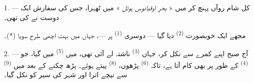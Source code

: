 %
%
%


\VUsaut{3.0mm}
\VUsaut{1.6mm}
\VUsaut{2.0mm}
\VUsaut{3.4mm}

1. --- کل شام روآں پہنچ کر میں « \textit{بحرِ اوقیانوس ہوٹل} » میں
ٹھہرا، جس کی سفارش ایک دوست نے کی تھی۔

مجھے ایک خوبصورت  \textsuperscript{(2)} دیا گیا —
دوسری  \textsuperscript{(1)} پر —، جہاں میں بہت اچھی طرح
سویا (*)۔

2. --- آج صبح اپنے کمرے سے نکل کر، جہاں 
\textsuperscript{(3)} ناشتہ لے آئی تھی، میں  \textsuperscript{(5)} میں گیا، جو 
\textsuperscript{(4)} کے طور پر بھی کام آتا ہے، تاکہ 
\textsuperscript{(6)} پڑھوں،  \textsuperscript{(8)}
پیتے ہوئے۔ پڑھ چکنے کے بعد میں  \textsuperscript{(9)} سے نیچے
اترا اور شہر کی سیر کو نکل گیا۔

